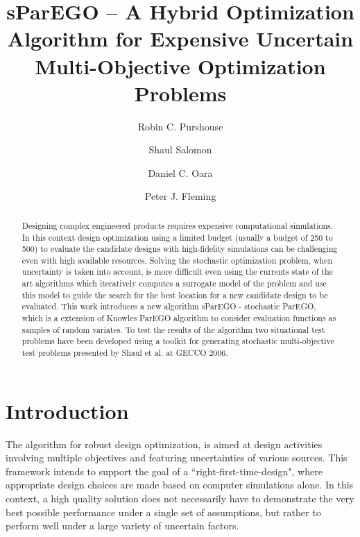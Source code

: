 \documentclass[10pt]{llncs}
\begin{document}
\title{sParEGO -- A Hybrid Optimization Algorithm for Expensive Uncertain Multi-Objective Optimization Problems}
\author{Robin C. Purshouse \and Shaul Salomon \and Daniel C. Oara \and Peter J. Fleming}

\maketitle

\begin{abstract}
Designing complex engineered products requires expensive computational simulations. In this context design optimization using a limited budget (usually a budget of 250 to 500) to evaluate the candidate designs with high-fidelity simulations can be challenging even with high available resources. Solving the stochastic optimization problem, when uncertainty is taken into account, is more difficult even using the currents state of the art algorithms which iteratively computes a surrogate model of the problem and use this model to guide the search for the best location for a new candidate design to be evaluated. This work introduces a new algorithm sParEGO - stochastic ParEGO, which is a extension of Knowles ParEGO algorithm \cite{Knowles2006ParEGO} to consider evaluation functions as samples of random variates. To test the results of the algorithm two situational test problems have been developed using a toolkit for generating stochastic multi-objective test problems presented by Shaul et al. at GECCO 2006.    

    
\end{abstract}

\section{\label{sec:intro}Introduction}
The algorithm for robust design optimization, is aimed at design activities involving
multiple objectives and featuring uncertainties of various sources. This framework intends to support the goal of a ``right-first-time-design", where appropriate design choices are made based on computer simulations alone. In this context, a high quality solution does not necessarily have to demonstrate the very best possible performance under a single set of assumptions, but rather to perform well under a large variety of uncertain factors.
\end{document}
